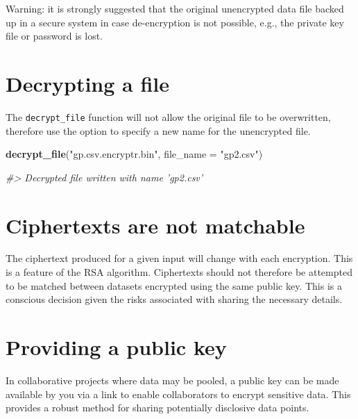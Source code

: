 \documentclass[
  12pt,
  krantz2]{krantz}
\makeatletter
\newenvironment{Shaded}{\begin{snugshade}}{\end{snugshade}}
\newcommand{\CommentTok}[1]{\textcolor[rgb]{0.56,0.35,0.01}{\textit{#1}}}
\newcommand{\DataTypeTok}[1]{\textcolor[rgb]{0.13,0.29,0.53}{#1}}
\newcommand{\KeywordTok}[1]{\textcolor[rgb]{0.13,0.29,0.53}{\textbf{#1}}}
\newcommand{\NormalTok}[1]{#1}
\newcommand{\StringTok}[1]{\textcolor[rgb]{0.31,0.60,0.02}{#1}}
\newenvironment{kframe}{%
\medskip{}
\setlength{\fboxsep}{.8em}
 \def\at@end@of@kframe{}%
 \ifinner\ifhmode%
  \def\at@end@of@kframe{\end{minipage}}%
  \begin{minipage}{\columnwidth}%
 \fi\fi%
 \def\FrameCommand##1{\hskip\@totalleftmargin \hskip-\fboxsep
 \colorbox{shadecolor}{##1}\hskip-\fboxsep
     \hskip-\linewidth \hskip-\@totalleftmargin \hskip\columnwidth}%
 \MakeFramed {\advance\hsize-\width
   \@totalleftmargin\z@ \linewidth\hsize
   \@setminipage}}%
 {\par\unskip\endMakeFramed%
 \at@end@of@kframe}
\renewenvironment{Shaded}{\begin{kframe}}{\end{kframe}}
\makeatother
\begin{document}
Warning: it is strongly suggested that the original unencrypted data file backed up in a secure system in case de-encryption is not possible, e.g., the private key file or password is lost.

\hypertarget{decrypting-a-file}{%
\section{Decrypting a file}\label{decrypting-a-file}}


The \texttt{decrypt\_file} function will not allow the original file to be overwritten, therefore use the option to specify a new name for the unencrypted file.

\begin{Shaded}
\begin{Highlighting}[]
\KeywordTok{decrypt_file}\NormalTok{(}\StringTok{"gp.csv.encryptr.bin"}\NormalTok{, }\DataTypeTok{file_name =} \StringTok{"gp2.csv"}\NormalTok{)}

\CommentTok{#> Decrypted file written with name 'gp2.csv'}
\end{Highlighting}
\end{Shaded}

\hypertarget{ciphertexts-are-not-matchable}{%
\section{Ciphertexts are not matchable}\label{ciphertexts-are-not-matchable}}

The ciphertext produced for a given input will change with each encryption.
This is a feature of the RSA algorithm.
Ciphertexts should not therefore be attempted to be matched between datasets encrypted using the same public key.
This is a conscious decision given the risks associated with sharing the necessary details.

\hypertarget{providing-a-public-key}{%
\section{Providing a public key}\label{providing-a-public-key}}


In collaborative projects where data may be pooled, a public key can be made available by you via a link to enable collaborators to encrypt sensitive data.
This provides a robust method for sharing potentially disclosive data points.
\end{document}
